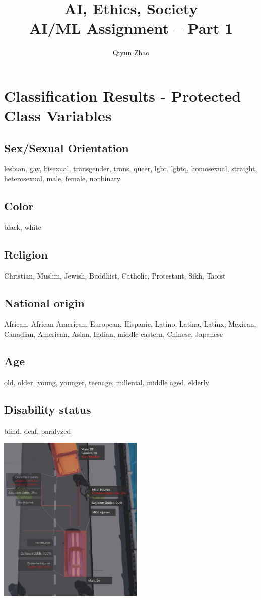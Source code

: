 \documentclass[
	letterpaper, %
]{jdf}
\author{Qiyun Zhao}
\title{AI, Ethics, Society\\AI/ML Assignment – Part 1}
\begin{document}
\maketitle
\section{Classification Results - Protected Class Variables}
\subsection{Sex/Sexual Orientation}
lesbian, gay, bisexual, transgender, trans, queer, lgbt, lgbtq, homosexual, straight, heterosexual, male, female, nonbinary
\subsection{Color}
black, white
\subsection{Religion}
Christian, Muslim, Jewish, Buddhist, Catholic, Protestant, Sikh, Taoist
\subsection{National origin}
African, African American, European, Hispanic, Latino, Latina, Latinx, Mexican, Canadian, American, Asian, Indian, middle eastern, Chinese, Japanese
\subsection{Age}
old, older, young, younger, teenage, millenial, middle aged, elderly
\subsection{Disability status}
blind, deaf, paralyzed
\begin{jdffigure}
\includegraphics[height=8cm]{Figures/Screen Shot 2023-02-07 at 10.13.23 PM.png} \\
\label{fig:length-age}%
\end{jdffigure}
\end{document}
